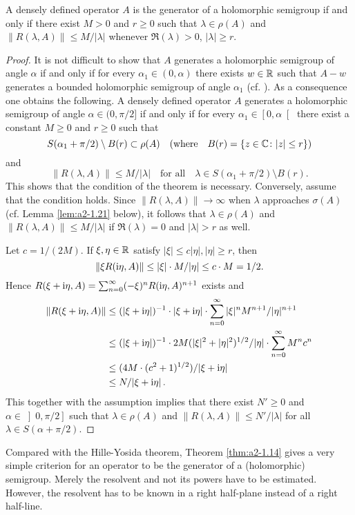 \begin{theorem}\label{thm:a2-1.14}
A densely defined operator $A$ is the generator of a holomorphic semigroup if and only if there exist $M > 0$ and $r \geq 0$ such that $\lambda \in \rho(A)$ and $\|R(\lambda,A)\| \leq M/|\lambda|$ whenever $\Re(\lambda) > 0$, $|\lambda| \geq r$.
\end{theorem}
\begin{proof}
It is not difficult to show that $A$ generates a holomorphic semigroup of angle $\alpha$ if and only if for every $\alpha_{1} \in (0,\alpha)$ there exists 
$w \in \mathbb{R}$ such that $A - w$ generates a bounded holomorphic semigroup of angle 
$\alpha_{1}$ (cf. \citet[p.252]{reedsimon:1978}).
As a consequence one obtains the following.
A densely defined operator $A$ generates a holomorphic semigroup of angle $\alpha \in (0,\pi/2]$ if and only if for every $\alpha_{1} \in \left[0,\alpha\right[$ there exist a constant $M \geq 0$ and $r \geq 0$ such that 
\[
S(\alpha_{1} + \pi/2) \setminus B(r) \subset \rho(A) \quad (\text{where} \quad B(r) = \{z \in \mathbb{C} \colon |z| \leq r\})
\]
and
\[
\|R(\lambda,A)\| \leq M/|\lambda|  \quad \text{for all}  \quad \lambda \in S(\alpha_{1}+\pi/2) \setminus B(r).
\]
This shows that the condition of the theorem is necessary.
Conversely, assume that the condition holds.
Since $\|R(\lambda,A)\| \to \infty$ when $\lambda$ approaches $\sigma(A)$ (cf. Lemma  \ref{lem:a2-1.21}   below), 
it follows that $\lambda \in \rho(A)$ and $\|R(\lambda,A)\| \leq M/|\lambda|$ if $\Re(\lambda) = 0$ and $|\lambda| > r$ as well.

Let $c = 1/(2M)$.
If $\xi, \eta \in \mathbb{R}$ satisfy 
$|\xi| \leq c|\eta|, |\eta| \geq r$, 
then 
\[
\|\xi R(\mathrm{i}\eta,A)\| \leq |\xi| \cdot M/|\eta| \leq c \cdot M = 1/2.
\]
Hence $R(\xi+\mathrm{i}\eta,A) = \sum_{n=0}^\infty (-\xi)^{n}R(\mathrm{i}\eta,A)^{n+1}$ exists and 
\begin{align*}
    \|R(\xi+\mathrm{i}\eta,A)\| &\leq 
    (|\xi + \mathrm{i}\eta|)^{-1} \cdot |\xi + \mathrm{i}\eta| \cdot \sum_{n=0}^\infty |\xi|^{n}M^{n+1}/|\eta|^{n+1}\\
    &\leq  (|\xi + \mathrm{i}\eta|)^{-1} \cdot 2M (|\xi|^{2} + |\eta|^{2})^{1/2} / |\eta| \cdot \sum_{n=0}^\infty M^{n}c^{n}\\   
    &\leq  (4M\cdot(c^{2}+1)^{1/2})/|\xi+\mathrm{i}\eta| \\
    &\leq N/|\xi+\mathrm{i}\eta| \, . 
\end{align*}
This together with the assumption implies that there exist $N' \geq 0$ and $\alpha \in \left]0,\pi/2\right]$ such that $\lambda \in \rho(A)$ and $\|R(\lambda,A)\| \leq N'/|\lambda|$ for all $\lambda \in S(\alpha+\pi/2)$.
\end{proof}
Compared with the Hille-Yosida theorem, Theorem \ref{thm:a2-1.14}   gives a very simple criterion for an operator to be the generator of a (holomorphic) semigroup.
Merely the resolvent and not its powers have to be
estimated.
However, the resolvent has to be known in a right half-plane instead of a right half-line.

